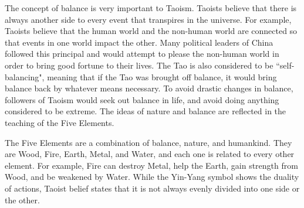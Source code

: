 \documentclass[12pt]{hw}
\begin{document}
The concept of balance is very important to Taoism. Taoists believe that there is always another side to every event that transpires in the universe. For example, Taoists believe that the human world and the non-human world are connected so that events in one world impact the other. Many political leaders of China followed this principal and would attempt to please the non-human world in order to bring good fortune to their lives. The Tao is also considered to be ``self-balancing", meaning that if the Tao was brought off balance, it would bring balance back by whatever means necessary. To avoid drastic changes in balance, followers of Taoism would seek out balance in life, and avoid doing anything considered to be extreme. The ideas of nature and balance are reflected in the teaching of the Five Elements.

The Five Elements are a combination of balance, nature, and humankind. They are Wood, Fire, Earth, Metal, and Water, and each one is related to every other element. For example, Fire can destroy Metal, help the Earth, gain strength from Wood, and be weakened by Water. While the Yin-Yang symbol shows the duality of actions, Taoist belief states that it is not always evenly divided into one side or the other.
\end{document}

